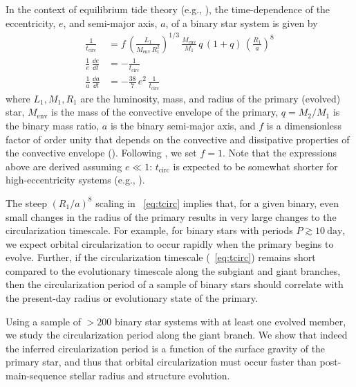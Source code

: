 \documentclass[modern, letterpaper]{aastex62}
\begin{document}
In the context of equilibrium tide theory (e.g., \citealt{Zahn:1989}), the
time-dependence of the eccentricity, $e$, and semi-major axis, $a$, of a binary
star system is given by
\begin{align}
    \frac{1}{t_\textrm{circ}} &= f \,
        \left(\frac{L_1}{M_{\textrm{env}} \, R_1^2}\right)^{1/3} \,
        \frac{M_{\textrm{env}}}{M_1} \,
        q \, (1 + q) \,
        \left(\frac{R_1}{a}\right)^8 \label{eq:tcirc}\\
    \frac{1}{e} \, \frac{\dd e}{\dd t} &= - \frac{1}{t_\textrm{circ}}
        \label{eq:dlne} \\
    \frac{1}{a} \, \frac{\dd a}{\dd t} &= - \frac{38}{7} \, e^2 \,
        \frac{1}{t_\textrm{circ}} \label{eq:dlna}
\end{align}
where $L_1, M_1, R_1$ are the luminosity, mass, and radius of the primary
(evolved) star, $M_{\textrm{env}}$ is the mass of the convective envelope of the
primary, $q = M_2 / M_1$ is the binary mass ratio, $a$ is the binary semi-major
axis, and $f$ is a dimensionless factor of order unity that depends on the
convective and dissipative properties of the convective envelope
(\citealt{Zahn:1977, Zahn:1989, Verbunt:1995}).
Following \citet{Verbunt:1995}, we set $f=1$.
Note that the expressions above are derived assuming $e \ll 1$:
$t_\textrm{circ}$ is expected to be somewhat shorter for high-eccentricity
systems (e.g., \citealt{Hut:1981}).

The steep $\left(R_1 / a\right)^8$ scaling in \eqname~\ref{eq:tcirc}
implies that, for a given binary, even small changes in the radius of the
primary results in very large changes to the circularization timescale.
For example, for binary stars with periods $P \gtrsim 10~\textrm{day}$, we
expect orbital circularization to occur rapidly when the primary begins to
evolve.
Further, if the circularization timescale (\eqname~\ref{eq:tcirc}) remains short
compared to the evolutionary timescale along the subgiant and giant branches,
then the circularization period of a sample of binary stars should correlate
with the present-day radius or evolutionary state of the primary.

Using a sample of $>200$ binary star systems with at least one evolved member,
we study the circularization period along the giant branch.
We show that indeed the inferred circularization period is a function of the
surface gravity of the primary star, and thus that orbital circularization must
occur faster than post-main-sequence stellar radius and structure evolution.
\end{document}
